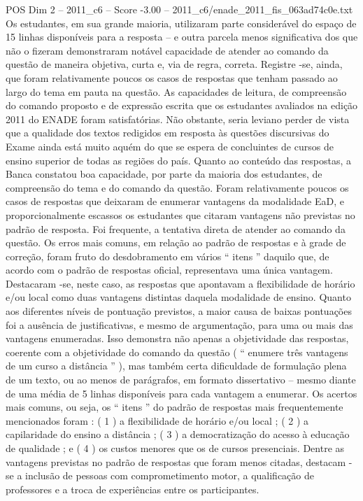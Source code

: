 \begin{textsample}{POS Dim 2 – 2011\_c6 – Score -3.00 – 2011\_c6/enade\_2011\_fis\_063ad74c0e.txt}
Os estudantes, em sua grande maioria, utilizaram parte considerável do espaço de 15 linhas disponíveis para a resposta – e outra parcela menos significativa dos que não o fizeram demonstraram notável capacidade de atender ao comando da questão de maneira objetiva, curta e, via de regra, correta.
Registre -se, ainda, que foram relativamente poucos os casos de respostas que tenham passado ao largo do tema em pauta na questão.
As capacidades de leitura, de compreensão do comando proposto e de expressão escrita que os estudantes avaliados na edição 2011 do ENADE foram satisfatórias.
Não obstante, seria leviano perder de vista que a qualidade dos textos redigidos em resposta às questões discursivas do Exame ainda está muito aquém do que se espera de concluintes de cursos de ensino superior de todas as regiões do país.
Quanto ao conteúdo das respostas, a Banca constatou boa capacidade, por parte da maioria dos estudantes, de compreensão do tema e do comando da questão.
Foram relativamente poucos os casos de respostas que deixaram de enumerar vantagens da modalidade EaD, e proporcionalmente escassos os estudantes que citaram vantagens não previstas no padrão de resposta.
Foi frequente, a tentativa direta de atender ao comando da questão.
Os erros mais comuns, em relação ao padrão de respostas e à grade de correção, foram fruto do desdobramento em vários “ itens ” daquilo que, de acordo com o padrão de respostas oficial, representava uma única vantagem.
Destacaram -se, neste caso, as respostas que apontavam a flexibilidade de horário e/ou local como duas vantagens distintas daquela modalidade de ensino.
Quanto aos diferentes níveis de pontuação previstos, a maior causa de baixas pontuações foi a ausência de justificativas, e mesmo de argumentação, para uma ou mais das vantagens enumeradas.
Isso demonstra não apenas a objetividade das respostas, coerente com a objetividade do comando da questão ( “ enumere três vantagens de um curso a distância ” ), mas também certa dificuldade de formulação plena de um texto, ou ao menos de parágrafos, em formato dissertativo – mesmo diante de uma média de 5 linhas disponíveis para cada vantagem a enumerar.
Os acertos mais comuns, ou seja, os “ itens ” do padrão de respostas mais frequentemente mencionados foram : ( 1 ) a flexibilidade de horário e/ou local ; ( 2 ) a capilaridade do ensino a distância ; ( 3 ) a democratização do acesso à educação de qualidade ; e ( 4 ) os custos menores que os de cursos presenciais.
Dentre as vantagens previstas no padrão de respostas que foram menos citadas, destacam -se a inclusão de pessoas com comprometimento motor, a qualificação de professores e a troca de experiências entre os participantes.

\end{textsample}
